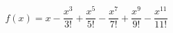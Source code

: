 \documentclass[preview]{standalone}
\begin{document}
\begin{align*}
f(x)=x-\dfrac{x^3}{3!}+\dfrac{x^5}{5!}-\dfrac{x^7}{7!}+\dfrac{x^9}{9!}-\dfrac{x^11}{11!}
\end{align*}
\end{document}
